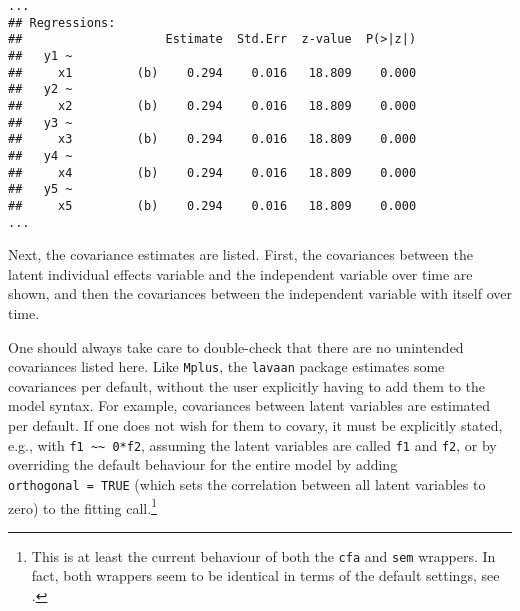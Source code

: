 \documentclass[]{interact}
\theoremstyle{plain}%
\theoremstyle{definition}
\theoremstyle{remark}
\begin{document}
\singlespacing

\begin{verbatim}
...
## Regressions:
##                    Estimate  Std.Err  z-value  P(>|z|)
##   y1 ~                                                
##     x1         (b)    0.294    0.016   18.809    0.000
##   y2 ~                                                
##     x2         (b)    0.294    0.016   18.809    0.000
##   y3 ~                                                
##     x3         (b)    0.294    0.016   18.809    0.000
##   y4 ~                                                
##     x4         (b)    0.294    0.016   18.809    0.000
##   y5 ~                                                
##     x5         (b)    0.294    0.016   18.809    0.000
...
\end{verbatim}

\doublespacing

Next, the covariance estimates are listed. First, the covariances
between the latent individual effects variable and the independent
variable over time are shown, and then the covariances between the
independent variable with itself over time.

One should always take care to double-check that there are no unintended
covariances listed here. Like \texttt{Mplus}, the \texttt{lavaan}
package estimates some covariances per default, without the user
explicitly having to add them to the model syntax. For example,
covariances between latent variables are estimated per default. If one
does not wish for them to covary, it must be explicitly stated, e.g.,
with \texttt{f1\ \textasciitilde{}\textasciitilde{}\ 0*f2}, assuming the
latent variables are called \texttt{f1} and \texttt{f2}, or by
overriding the default behaviour for the entire model by adding
\texttt{orthogonal\ =\ TRUE} (which sets the correlation between all
latent variables to zero) to the fitting call.\footnote{This is at least
  the current behaviour of both the \texttt{cfa} and \texttt{sem}
  wrappers. In fact, both wrappers seem to be identical in terms of the
  default settings, see \citet{Rosseel2020}.}

\singlespacing
\end{document}
